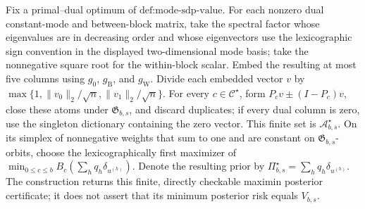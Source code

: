 Fix a primal--dual optimum of \(\text{def:mode-sdp-value}\).  For each nonzero dual constant-mode and between-block matrix, take the spectral factor whose eigenvalues are in decreasing order and whose eigenvectors use the lexicographic sign convention in the displayed two-dimensional mode basis; take the nonnegative square root for the within-block scalar.  Embed the resulting at most five columns using \(g_0\), \(g_{\mathrm B}\), and \(g_{\mathrm W}\).  Divide each embedded vector \(v\) by \(\max\{1,\|v_0\|_2/\sqrt n,\|v_1\|_2/\sqrt n\}\).  For every \(c\in\mathcal C^{\star}\), form \(P_cv\pm(I-P_c)v\), close these atoms under \(\mathfrak G_{b,s}\), and discard duplicates; if every dual column is zero, use the singleton dictionary containing the zero vector.  This finite set is \(\mathcal A_{b,s}^{\star}\).  On its simplex of nonnegative weights that sum to one and are constant on \(\mathfrak G_{b,s}\)-orbits, choose the lexicographically first maximizer of \(\min_{0\le c\le b}B_c(\sum_hq_h\delta_{u^{(h)}})\).  Denote the resulting prior by \(\Pi_{b,s}^{\star}=\sum_hq_h\delta_{u^{(h)}}\).  The construction returns this finite, directly checkable maximin posterior certificate; it does not assert that its minimum posterior risk equals \(V_{b,s}\).